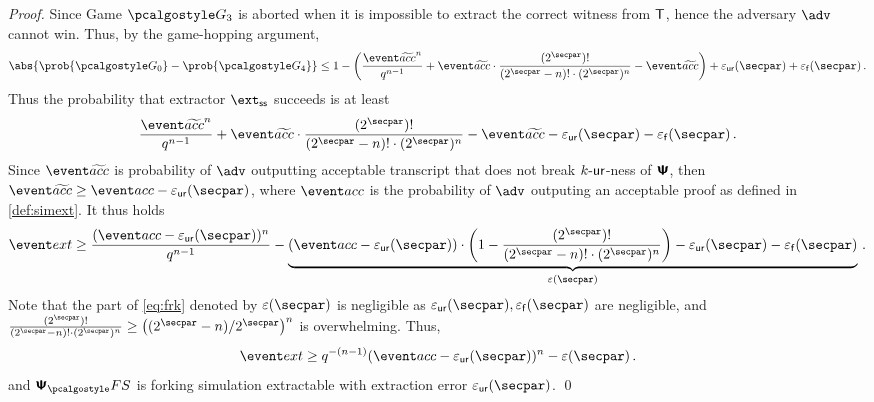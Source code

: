 \documentclass[runningheads,11pt]{llncs}
\newcommand{\ourpar}[1] {\smallskip\noindent\emph{#1}}
\begin{document}
\begin{proof}
Since Game $\game{3}$ is aborted when it is impossible to extract the correct witness
from $\mathsf{T}$, hence the adversary $\advse$ cannot win.  Thus, by the game-hopping
argument,
\[
	\abs{\prob{\game{0}} - \prob{\game{4}}} \leq 1 -
  \left(\frac{\waccProb^{n}}{q^{n - 1}} + \waccProb \cdot \frac{(2^\secpar)
      !}{(2^\secpar - n)! \cdot (2^\secpar)^{n}} - \waccProb\right) + \epsur(\secpar) +
  \epsss(\secpar)\,.
\]
Thus the probability that extractor $\extss$ succeeds is at least
\[
	\frac{\waccProb^{n}}{q^{n - 1}} + \waccProb \cdot \frac{(2^\secpar)
    !}{(2^\secpar - n)! \cdot (2^\secpar)^{n}} - \waccProb - \epsur(\secpar) 
  - \epsss(\secpar)\,.
\]
Since $\waccProb$ is probability of $\advse$ outputting acceptable transcript
that does not break ${k\text{-}\mathsf{ur}}$-ness of $\bm{\mathsf{\Psi}}$, then $\waccProb \geq \accProb -
\epsur(\secpar)$, where $\accProb$ is the probability of $\advse$ outputing an acceptable
proof as defined in \cref{def:simext}. It thus holds
\begin{equation}
	\label{eq:frk}
	\extProb \geq \frac{(\accProb - \epsur(\secpar))^{n}}{q^{n - 1}} -
  \underbrace{(\accProb - \epsur(\secpar)) \cdot \left( 1 - \frac{(2^\secpar)
        !}{(2^\secpar - n)! \cdot (2^\secpar)^{n}}\right) - \epsur(\secpar) -
    \epsss(\secpar)}_{\eps(\secpar)}\,.
\end{equation}
Note that the part of \cref{eq:frk} denoted by $\eps(\secpar)$ is negligible as
$\epsur(\secpar), \epsss(\secpar)$ are negligible, and
$\frac{(2^\secpar) !}{(2^\secpar - n)! \cdot (2^\secpar)^{n}} \geq
\left(\infrac{(2^\secpar - n)}{2^\secpar}\right)^{n}$ is overwhelming.  Thus,
\[
	\extProb \geq q^{-(n - 1)} (\accProb - \epsur(\secpar))^{n} -\eps(\secpar)\,.
\] 
and $\psfs$ is forking simulation extractable with extraction error $\epsur(\secpar)$.
\qed
\end{proof}

\end{document}
